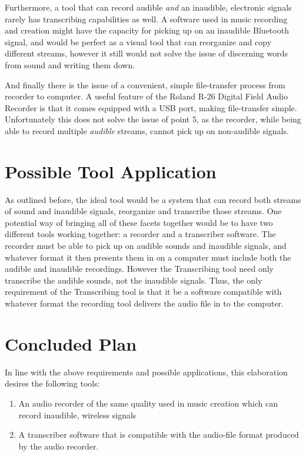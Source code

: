 \documentclass{article}
\begin{document}
Furthermore, a tool that can record audible  \textit{and} an inaudible, electronic signals rarely has transcribing capabilities as well. A software used in music recording and creation might have the capacity for picking up on an inaudible Bluetooth signal, and would be perfect as a visual tool that can reorganize and copy different streams, however it still would not solve the issue of discerning words from sound and writing them down.

And finally there is the issue of a convenient, simple file-transfer process from recorder to computer. A useful feature of the Roland R-26 Digital Field Audio Recorder is that it comes equipped with a USB port, making file-transfer simple. Unfortunately this does not solve the issue of point 5, as the recorder, while being able to record multiple \textit{audible} streams, cannot pick up on non-audible signals.

\section{Possible Tool Application}
As outlined before, the ideal tool would be a system that can record both streams of sound and inaudible signals, reorganize and transcribe those streams. One potential way of bringing all of these facets together would be to have two different tools working together: a recorder and a transcriber software. The recorder must be able to pick up on audible sounds and inaudible signals, and whatever format it then presents them in on a computer must include both the audible and inaudible recordings. However the Transcribing tool need only transcribe the audible sounds, not the inaudible signals. Thus, the only requirement of the Transcribing tool is that it be a software compatible with whatever format the recording tool delivers the audio file in to the computer.

\section{Concluded Plan}
In line with the above requirements and possible applications,  this elaboration desires the following tools: 
\begin{enumerate}
\item An audio recorder of the same quality used in music creation which can record inaudible, wireless signals
\item A transcriber software that is compatible with the audio-file format produced by the audio recorder.
\end{enumerate}
\end{document}
